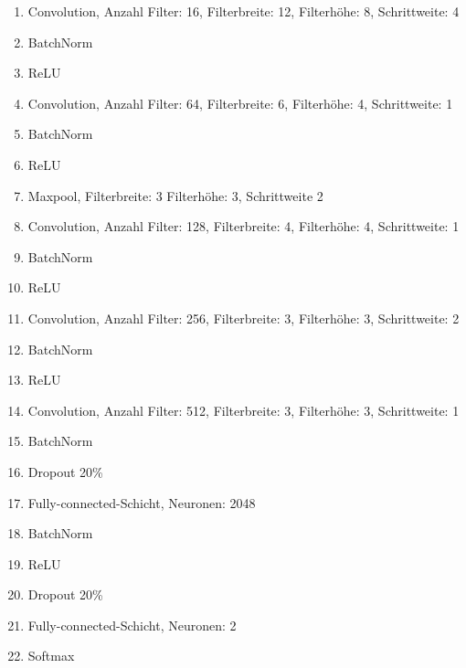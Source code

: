 \documentclass[12pt,a4paper]{report}
\begin{document}
\begin{enumerate}
    \setlength\itemsep{0cm}
    \setlength{\parskip}{0pt}
    \setlength{\parsep}{0pt}
    \item Convolution, Anzahl Filter: 16, Filterbreite: 12, Filterhöhe: 8, Schrittweite: 4
    \item BatchNorm
    \item ReLU
    \item Convolution, Anzahl Filter: 64, Filterbreite: 6, Filterhöhe: 4, Schrittweite: 1
    \item BatchNorm
    \item ReLU
    \item Maxpool, Filterbreite: 3 Filterhöhe: 3, Schrittweite 2
    \item Convolution, Anzahl Filter: 128, Filterbreite: 4, Filterhöhe: 4, Schrittweite: 1
    \item BatchNorm
    \item ReLU
    \item Convolution, Anzahl Filter: 256, Filterbreite: 3, Filterhöhe: 3, Schrittweite: 2
    \item BatchNorm
    \item ReLU
    \item Convolution, Anzahl Filter: 512, Filterbreite: 3, Filterhöhe: 3, Schrittweite: 1
    \item BatchNorm
    \item Dropout 20\%
    \item Fully-connected-Schicht, Neuronen: 2048
    \item BatchNorm
    \item ReLU
    \item Dropout 20\%
    \item Fully-connected-Schicht, Neuronen: 2
    \item Softmax
\end{enumerate}
\end{document}
